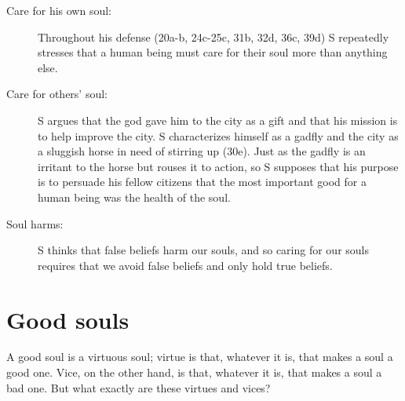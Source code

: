 \documentclass[oneside]{article}
\begin{document}
\begin{description}
\item[Care for his own soul:] Throughout his defense (20a-b, 24c-25c, 31b, 32d, 36c, 39d) S repeatedly stresses that a human being must care for their soul more than anything else. 
\item[Care for others' soul:] S argues that the god gave him to the city as a gift and that his mission is to help improve the city.  S characterizes himself as a gadfly and the city as a sluggish horse in need of stirring up (30e).  Just as the gadfly is an irritant to the horse but rouses it to action, so S supposes that his purpose is to persuade his fellow citizens that the most important good for a human being was the health of the soul.
\item[Soul harms:] S thinks that false beliefs harm our souls, and so caring for our souls requires that we avoid false beliefs and only hold true beliefs. 
\end{description}

\section*{Good souls}
A good soul is a virtuous soul; virtue is that, whatever it is, that makes a soul a good one. Vice, on the other hand, is that, whatever it is, that makes a soul a bad one. But what exactly are these virtues and vices? 
\end{document}
